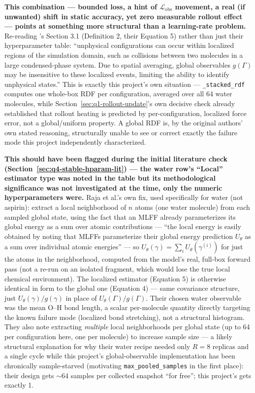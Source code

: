 \documentclass[11pt]{article}
\begin{document}
\textbf{This combination --- bounded loss, a hint of $\mathcal{L}_{\text{obs}}$
movement, a real (if unwanted) shift in static accuracy, yet zero
measurable rollout effect --- points at something more structural than a
learning-rate problem.} Re-reading \citet{raja2025stable}'s Section 3.1
(Definition 2, their Equation 5) rather than just their hyperparameter
table: ``unphysical configurations can occur within localized regions of
the simulation domain, such as collisions between two molecules in a
large condensed-phase system. Due to spatial averaging, global observables
$g(\Gamma)$ may be insensitive to these localized events, limiting the
ability to identify unphysical states.'' This is exactly this project's
own situation --- \texttt{\_stacked\_rdf} computes one whole-box RDF per
configuration, averaged over all 64 water molecules, while
Section~\ref{sec:q1-rollout-update}'s own decisive check already
established that rollout heating is predicted by per-configuration,
localized force error, not a global/uniform property. A global RDF is, by
the original authors' own stated reasoning, structurally unable to see or
correct exactly the failure mode this project independently characterized.

\textbf{This should have been flagged during the initial literature check
(Section~\ref{sec:q4-stable-hparam-lit}) --- the water row's ``Local''
estimator type was noted in the table but its methodological significance
was not investigated at the time, only the numeric hyperparameters were.}
Raja et al.'s own fix, used specifically for water (not aspirin): extract a
local neighborhood of $n$ atoms (one water molecule) from each sampled
global state, using the fact that an MLFF already parameterizes its global
energy as a sum over atomic contributions --- ``the local energy is easily
obtained by noting that MLFFs parameterize their global energy prediction
$U_\theta$ as a sum over individual atomic energies'' --- so
$U_\theta(\gamma)=\sum_i U_\theta(\gamma^{(i)})$ for just the atoms in the
neighborhood, computed from the model's real, full-box forward pass (not a
re-run on an isolated fragment, which would lose the true local chemical
environment). The localized estimator (Equation 5) is otherwise
identical in form to the global one (Equation 4) --- same covariance
structure, just $U_\theta(\gamma)/g(\gamma)$ in place of
$U_\theta(\Gamma)/g(\Gamma)$. Their chosen water observable was the mean
O--H bond length, a scalar per-molecule quantity directly targeting the
known failure mode (localized bond stretching), not a structural histogram.
They also note extracting \emph{multiple} local neighborhoods per global
state (up to 64 per configuration here, one per molecule) to increase
sample size --- a likely structural explanation for why their water
recipe needed only $R=8$ replicas and a single cycle while this project's
global-observable implementation has been chronically sample-starved
(motivating \texttt{max\_pooled\_samples} in the first place): their
design gets $\sim$64 samples per collected snapshot ``for free''; this
project's gets exactly 1.
\end{document}
